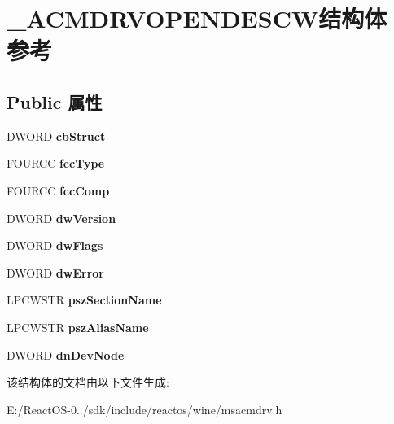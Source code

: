 \hypertarget{struct___a_c_m_d_r_v_o_p_e_n_d_e_s_c_w}{}\section{\+\_\+\+A\+C\+M\+D\+R\+V\+O\+P\+E\+N\+D\+E\+S\+C\+W结构体 参考}
\label{struct___a_c_m_d_r_v_o_p_e_n_d_e_s_c_w}
\subsection*{Public 属性}
\begin{DoxyCompactItemize}
\item 
\mbox{\label{struct___a_c_m_d_r_v_o_p_e_n_d_e_s_c_w_afc9d458e4b0e8299c41a7697e1aaa791}} 
D\+W\+O\+RD {\bfseries cb\+Struct}
\item 
\mbox{\label{struct___a_c_m_d_r_v_o_p_e_n_d_e_s_c_w_a0ae06b326d0eba933232fb5b5b634114}} 
F\+O\+U\+R\+CC {\bfseries fcc\+Type}
\item 
\mbox{\label{struct___a_c_m_d_r_v_o_p_e_n_d_e_s_c_w_aa230e0348d5e3d567d33c868b8694e77}} 
F\+O\+U\+R\+CC {\bfseries fcc\+Comp}
\item 
\mbox{\label{struct___a_c_m_d_r_v_o_p_e_n_d_e_s_c_w_ad4e091e4ae64480e1ce1f11f03a8aaab}} 
D\+W\+O\+RD {\bfseries dw\+Version}
\item 
\mbox{\label{struct___a_c_m_d_r_v_o_p_e_n_d_e_s_c_w_a6f2e8a8fd375c33a257fa726c32e0542}} 
D\+W\+O\+RD {\bfseries dw\+Flags}
\item 
\mbox{\label{struct___a_c_m_d_r_v_o_p_e_n_d_e_s_c_w_ad76d468b5da224bcb578427f139d0aee}} 
D\+W\+O\+RD {\bfseries dw\+Error}
\item 
\mbox{\label{struct___a_c_m_d_r_v_o_p_e_n_d_e_s_c_w_a57cd121946878e61cd31f35a878cab26}} 
L\+P\+C\+W\+S\+TR {\bfseries psz\+Section\+Name}
\item 
\mbox{\label{struct___a_c_m_d_r_v_o_p_e_n_d_e_s_c_w_a0b4067e90cb249c15499fec25761547c}} 
L\+P\+C\+W\+S\+TR {\bfseries psz\+Alias\+Name}
\item 
\mbox{\label{struct___a_c_m_d_r_v_o_p_e_n_d_e_s_c_w_aff0415a3903753696e31607b83d974c7}} 
D\+W\+O\+RD {\bfseries dn\+Dev\+Node}
\end{DoxyCompactItemize}


该结构体的文档由以下文件生成\+:\begin{DoxyCompactItemize}
\item 
E\+:/\+React\+O\+S-\/0../sdk/include/reactos/wine/msacmdrv.\+h\end{DoxyCompactItemize}
